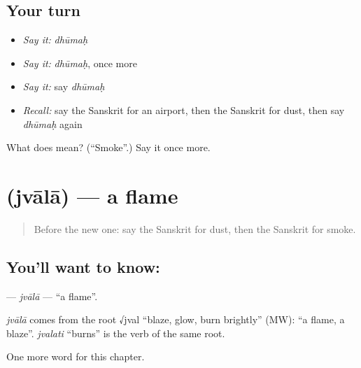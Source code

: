 \subsection*{Your turn}
\begin{itemize}
\raggedright
  \item \emph{Say it:} \emph{dhūmaḥ}
  \item \emph{Say it:} \emph{dhūmaḥ}, once more
  \item \emph{Say it:} say \emph{dhūmaḥ}
  \item \emph{Recall:} say the Sanskrit for an airport, then the Sanskrit for dust, then say \emph{dhūmaḥ} again
\end{itemize}

\begin{tcolorbox}[breakable,colback=teal!4,colframe=teal!35!black,title={Before you move on}]
What does  mean? (\textquotedblleft{}Smoke\textquotedblright{}.) Say it once more.
\end{tcolorbox}
\section[\texorpdfstring{\sk{ज्वाला} (jvālā)}{ज्वाला (jvālā)}]{ (jvālā) — a flame}

\label{lesson:SA-C165-jvala}



\begin{quote}
Before the new one: say the Sanskrit for dust, then the Sanskrit for smoke.
\end{quote}

\subsection*{You'll want to know: }
\textbf{} — \emph{jvālā} — \textquotedblleft{}a flame\textquotedblright{}.

\begin{cousinweb}
\emph{jvālā} comes from the root √jval \textquotedblleft{}blaze, glow, burn brightly\textquotedblright{} (MW): \textquotedblleft{}a flame, a blaze\textquotedblright{}. \emph{jvalati} \textquotedblleft{}burns\textquotedblright{} is the verb of the same root.
\end{cousinweb}

\begin{grammarlens}[title={What you've built}]
One more word for this chapter.
\end{grammarlens}

